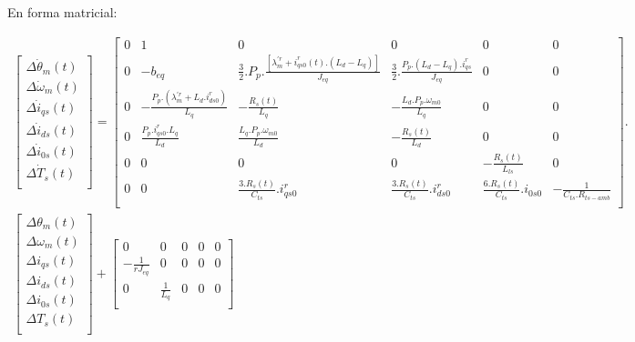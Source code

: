 \documentclass{article}
\begin{document}
\begin{itemize}
    En forma matricial:

\begin{equation*}
\begin{gathered}
    \begin{bmatrix}
        \Delta\dot{\theta}_{m}(t)\\
        \Delta\dot{\omega}_{m}(t)\\
        \Delta\dot{i}_{qs}(t)\\
        \Delta\dot{i}_{ds}(t)\\
        \Delta\dot{i}_{0s}(t)\\
        \Delta\dot{T}_{s}(t)\\
    \end{bmatrix} =
    \begin{bmatrix}
        0 & 1 & 0 & 0 & 0  & 0 \\
        0 & -b_{eq} & \frac{3}{2}.P_{p}.\frac{[\lambda_{m}^{\prime r} + i_{qs0}^r(t).(L_{d}-L_{q})]}{J_{eq}} & \frac{3}{2}.\frac{P_{p}.(L_{d}-L_{q}).i_{qs}^r}{J_{eq}} & 0 & 0\\
        0 & -\frac{P_{p}.(\lambda_{m}^{\prime r} + L_{d}.i_{ds0}^r)}{L_{q}} & -\frac{R_{s}(t)}{L_{q}} & -\frac{L_{d}.P_{p}.\omega_{m0}}{L_{q}} & 0 & 0\\
        0 & \frac{P_{p}.i_{qs0}^r .L_{q}}{L_{d}} & \frac{L_{q}.P_{p}.\omega_{m0}}{L_{d}} & -\frac{R_{s}(t)}{L_{d}} & 0 & 0\\
        0 & 0 & 0 & 0 & -\frac{R_{s}(t)}{L_{ls}} & 0\\
        0 & 0 & \frac{3.R_{s}(t)}{C_{ts}}.i_{qs0}^r & \frac{3.R_{s}(t)}{C_{ts}}.i_{ds0}^r & \frac{6.R_{s}(t)}{C_{ts}}.i_{0s0} & -\frac{1}{C_{ts}.R_{ts-amb}}\\
    \end{bmatrix}.\\
    \begin{bmatrix}
        \Delta{\theta}_{m}(t)\\
        \Delta{\omega}_{m}(t)\\
        \Delta{i}_{qs}(t)\\
        \Delta{i}_{ds}(t)\\
        \Delta{i}_{0s}(t)\\
        \Delta{T}_{s}(t)\\
    \end{bmatrix}  + 
    \begin{bmatrix}
        0 & 0 & 0 & 0 & 0\\
        -\frac{1}{rJ_{eq}} & 0 & 0 & 0 & 0\\
        0 & \frac{1}{L_{q}} & 0 & 0 & 0\\

\end{bmatrix}
\end{gathered}
\end{equation*}
\end{itemize}
\end{document}
